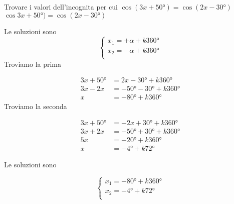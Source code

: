 \begin{exercise}
	Trovare i valori dell'incognita per cui $\cos(3x+\ang{50;;})=\cos(2x-\ang{30;;})$
	\tcblower
	$\cos3x+\ang{50;;})=\cos(2x-\ang{30;;})$
	
	Le soluzioni sono 
	\[\begin{cases}
	x_1=+\alpha+k\ang{360;;}\\
	x_2=-\alpha+k\ang{360;;}\\
	\end{cases}\]
	Troviamo la prima
	
	\begin{align*}
	3x+\ang{50;;}&=2x-\ang{30;;}+k\ang{360;;}\\
	3x-2x&=-\ang{50;;}-\ang{30;;}+k\ang{360;;}\\
	x&=-\ang{80;;}+k\ang{360;;}
	\end{align*}
 Troviamo la seconda
	
	\begin{align*}
	3x+\ang{50;;}&=-2x+\ang{30;;}+k\ang{360;;}\\
	3x+2x&=-\ang{50;;}+\ang{30;;}+k\ang{360;;}\\
	5x&=-\ang{20;;}+k\ang{360;;}\\
 x&=-\ang{4;;}+k\ang{72;;}
	\end{align*}
	
	Le soluzioni sono
	
	\[\begin{cases}
	x_1=-\ang{80;;}+k\ang{360;;}\\
	x_2=-\ang{4;;}+k\ang{72;;}\\
	\end{cases}\]
\end{exercise}
